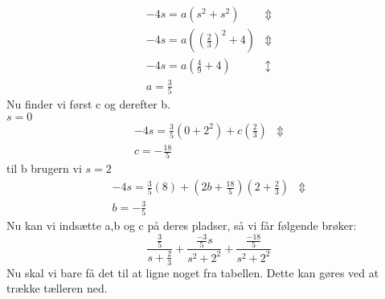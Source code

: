 \documentclass[11pt,fleqn]{book} %
\begin{document}
\begin{equation}
\begin{split}
-4s=a(s^2+s^2) & \Updownarrow \\
-4s=a((\frac{2}{3})^2+4) & \Updownarrow \\
-4s=a(\frac{4}{9} + 4) & \updownarrow \\
a=\frac{3}{5}
\end{split}
\end{equation}
Nu finder vi først c og derefter b.\\
$s=0$
\begin{equation}
\begin{split}
-4s=\frac{3}{5}(0+2^2)+c(\frac{2}{3}) & \Updownarrow \\
c=-\frac{18}{5}
\end{split}
\end{equation}
til b brugern vi $s=2$
\begin{equation}
\begin{split}
-4s=\frac{3}{5}(8)+(2b+ \frac{18}{5})(2+\frac{2}{3}) & \Updownarrow \\
b=- \frac{3}{5}
\end{split}
\end{equation}
Nu kan vi indsætte a,b og c på deres pladser, så vi får følgende brøker:
\begin{equation}
\frac{\frac{3}{5}}{s+ \frac{2}{3}}+ \frac{\frac{-3}{5}s}{s^2+2^2}+\frac{\frac{-18}{5}}{s^2+2^2}
\end{equation}
Nu skal vi bare få det til at ligne noget fra tabellen. Dette kan gøres ved at trække tælleren ned.
\end{document}
